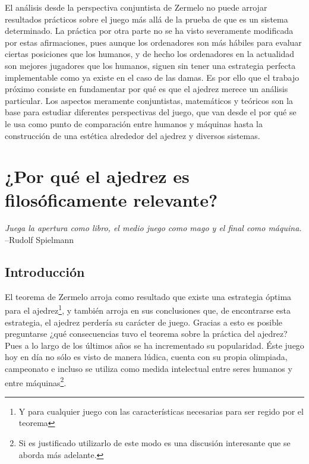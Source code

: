 \documentclass[twoside,openright,12pt,a4paper,spanish]{book}
\begin{document}
El an\'alisis desde la perspectiva conjuntista de Zermelo no puede arrojar resultados pr\'acticos sobre el juego m\'as all\'a de la prueba de que es un sistema determinado. La pr\'actica por otra parte no se ha visto severamente modificada por estas afirmaciones, pues aunque los ordenadores son m\'as h\'abiles para evaluar ciertas posiciones que los humanos, y de hecho los ordenadores en la actualidad son mejores jugadores que los humanos, siguen sin tener una estrategia perfecta implementable como ya existe en el caso de las damas. Es por ello que el trabajo pr\'oximo consiste en fundamentar por qu\'e es que el ajedrez merece un an\'alisis particular. Los aspectos meramente conjuntistas, matem\'aticos y te\'oricos son la base para estudiar diferentes perspectivas del juego, que van desde el por qu\'e se le usa como punto de comparaci\'on entre humanos y máquinas hasta la construcci\'on de una est\'etica alrededor del ajedrez y diversos sistemas.

\chapter{¿Por qué el ajedrez es filosóficamente relevante?}
\begin{flushright}
\textit{Juega la apertura como libro, el medio juego como mago y el final como máquina.}
--Rudolf Spielmann
\end{flushright}

\section{Introducci\'on}

\noindent El teorema de Zermelo arroja como resultado que existe una estrategia \'optima para el ajedrez\footnote{Y para cualquier juego con las características necesarias para ser regido por el teorema}, y tambi\'en arroja en sus conclusiones que, de encontrarse esta estrategia, el ajedrez perder\'ia su carácter de juego. Gracias a esto es posible preguntarse ¿qu\'e consecuencias tuvo el teorema sobre la pr\'actica del ajedrez? Pues a lo largo de los \'ultimos años se ha incrementado su popularidad. \'Este juego hoy en d\'ia no s\'olo es visto de manera l\'udica, cuenta con su propia olimpiada, campeonato e incluso se utiliza como medida intelectual entre seres humanos y entre máquinas\footnote{Si es justificado utilizarlo de este modo es una discusi\'on interesante que se aborda m\'as adelante.}.
\end{document}
